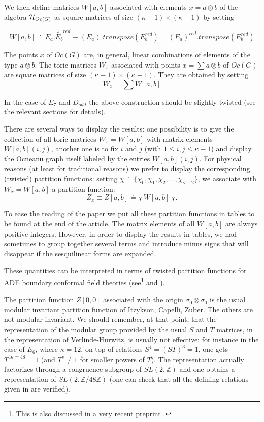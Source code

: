 \documentclass[a4paper,11pt]{article}
\def \otimesdot {\stackrel{\cdot}{\otimes}}
\newcommand{\ZZ}{\mathbb{Z}}
\begin{document}
We then define matrices $W[a,b]$ associated with elements $x =  a \otimes b$
of the algebra ${\cal H}_{Oc(G)}$ as square
matrices of size $(\kappa -1) \times (\kappa -1)$ by setting

$$
W[a,b] \doteq E_a . \widetilde{E_b}^{red} \equiv (E_a).
transpose(E_b^{red}) =
(E_a)^{red}. transpose(E_b^{red})
$$

The points $x$ of $Oc(G)$ are, in general, linear combinations of
elements of the type $a \otimesdot b$.
The toric matrices  $W_{x}$ associated with points $x = \sum a \otimesdot b$
of $Oc(G)$ are square matrices of size $(\kappa -1) \times (\kappa -1)$.
They are  obtained  by setting $$ W_{x}= \sum W[a,b] $$


In the case of $E_{7}$ and $D_{odd}$ the above construction should be
slightly twisted (see the relevant sections for details).

\smallskip

There are several ways to display the results: one possibility is to give
the collection of
all toric matrices
$W_{x} = W[a,b]$ with matrix elements $W[a,b](i,j)$, another one is to fix
$i$ and $j$ (with
$1\leq i,j\leq \kappa -1$)
and display the Ocneanu graph itself labeled by the entries
$W[a,b](i,j)$. For
physical reasons (at
least for traditional reasons)  we prefer to display the
corresponding (twisted)
partition functions: setting $\chi \doteq \{\chi_0, \chi_1, \chi_2, \ldots,
\chi_{\kappa -2}\}$, we
associate with $W_x = W[a,b]$
a partition function:
       $$Z_x \equiv Z[a,b] \doteq \overline{\chi} \, W[a,b] \, \chi .$$

       To ease the reading of the paper we  put all these partition functions in
       tables to be found at the end of the article. The matrix elements
       of all $W[a,b]$ are always positive integers. However, in order
       to display the results in tables, we had sometimes to group together
       several terms and introduce minus signs that will disappear if
       the sesquilinear forms are expanded.

These quantities can be interpreted in terms of twisted partition functions for
ADE boundary conformal field theories (see\footnote{This is also
discussed in a very recent preprint \cite{Otto}.}\cite{PetZub:Oc} and \cite{PetkovaZuber:bulk}).


The partition function $Z[0,0]$ associated with the origin $\sigma_0 \otimes
\sigma_0$ is the usual
modular invariant partition function of Itzykson, Capelli, Zuber. The
others are not modular invariant. We should remember, at that point, that
the representation of the modular group provided by the usual $S$ and $T$
matrices, in the representation of Verlinde-Hurwitz, is usually not effective:
for instance in the case of $E_{6}$, where $\kappa = 12$, on top of
relations  $S^4=(ST)^3=1$, one
gets $T^{4 \kappa = 48} = 1$ (and $T^s \neq 1$ for smaller powers of $T$). The
representation actually factorizes through a congruence subgroup of
$SL(2,\ZZ)$ and one obtains a representation of  $SL(2,\ZZ/48 \ZZ)$
(one can check that all the defining relations given in
\cite{CosteGannon:modular} are verified).
\end{document}
